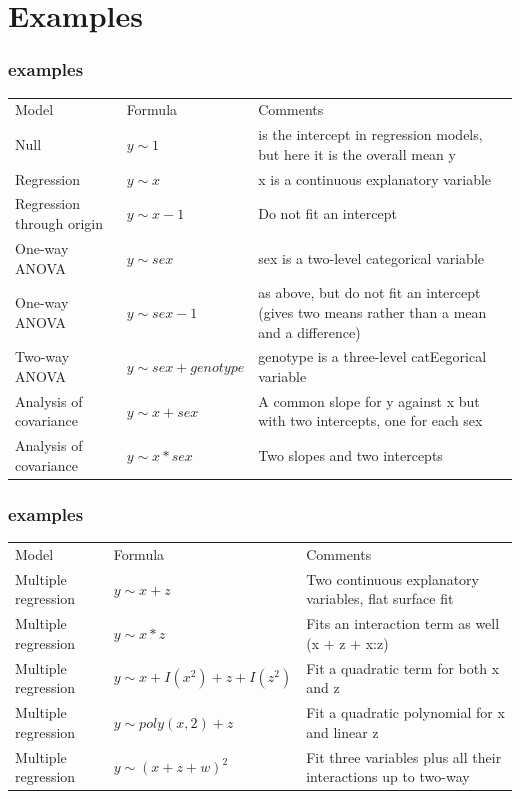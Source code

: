 \documentclass[xcolor={table},handout]{beamer}
\begin{document}
\section{Examples}

\begin{frame}\frametitle{examples}
\begin{center}\footnotesize
  \begin{tabular}{p{1.5cm} >{\ttfamily}p{2cm} p{6.2cm}} 
    \rowcolor{gray!40}
Model&Formula&Comments\\
Null&$y\sim 1$&is the intercept in regression models, but here it is the overall mean y\\
Regression&$y\sim x$ &x is a continuous explanatory variable\\
Regression through origin &$y \sim x-1$ & Do not fit an intercept\\
One-way ANOVA&$y \sim sex$ &sex is a two-level categorical variable\\
One-way ANOVA&$ y \sim sex-1$& as above, but do not fit an
                       intercept (gives two means
                      rather than a mean and a
                     difference)\\
Two-way ANOVA&$y \sim sex + genotype$&genotype is a three-level
                                catEegorical variable\\
Analysis of covariance&$y \sim x + sex$& A common slope for y against
                                  x but with two intercepts, one
                                 for each sex\\
Analysis of covariance&$y \sim x * sex$& Two slopes and two intercepts\\
\end{tabular}
\end{center}
\end{frame}

\begin{frame}\frametitle{examples}
\begin{center}\footnotesize
  \begin{tabular}{p{1.5cm} >{\ttfamily}p{2cm} p{6.2cm}} 
    \rowcolor{gray!40}
Model&Formula&Comments\\
Multiple regression&$y\sim x + z$& Two continuous explanatory
                           variables, flat surface fit\\
Multiple regression&$y\sim x * z$& Fits an interaction term as well
                           (x + z + x:z)\\
Multiple regression &$y \sim x + I(x^2) + z + I(z^2)$& Fit a quadratic term for both x
                                               and z\\
Multiple regression&$y \sim poly(x,2) + z$& Fit a quadratic polynomial for x
                                      and linear z\\
Multiple regression&$y \sim (x + z + w)^2$& Fit three variables plus all their
                                     interactions up to two-way
\end{tabular}
\end{center}
\end{frame}




\appendix
\flushlinkimages
\end{document}
